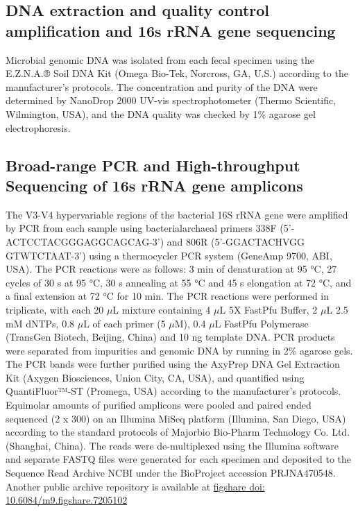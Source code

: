 \documentclass[fleqn,10pt]{wlpeerj} %
\begin{document}
  \subsection*{DNA extraction and quality control amplification and 16s rRNA gene sequencing}
  Microbial genomic DNA was isolated from each fecal specimen using the E.Z.N.A.® Soil DNA Kit (Omega Bio-Tek, Norcross, GA, U.S.) according to the manufacturer’s protocols. The concentration and purity of the DNA were determined by NanoDrop 2000 UV-vis spectrophotometer (Thermo Scientific, Wilmington, USA), and the DNA quality was checked by 1\% agarose gel electrophoresis.

  \subsection*{Broad-range PCR and High-throughput Sequencing of 16s rRNA gene amplicons}
  The V3-V4 hypervariable regions of the bacterial 16S rRNA gene were amplified by PCR from each sample using bacterial\/archaeal primers 338F (5’-ACTCCTACGGGAGGCAGCAG-3’) and 806R (5’-GGACTACHVGG GTWTCTAAT-3’) using a thermocycler PCR system (GeneAmp 9700, ABI, USA). The PCR reactions were as follows: 3 min of denaturation at 95 °C, 27 cycles of 30 s at 95 °C, 30 s annealing at 55 °C and 45 s elongation at 72 °C, and a final extension at 72 °C for 10 min. The PCR reactions were performed in triplicate, with each 20 $\mu$L mixture containing 4 $\mu$L 5X FastPfu Buffer, 2 $\mu$L 2.5 mM dNTPs, 0.8 $\mu$L of each primer (5 $\mu$M), 0.4 $\mu$L FastPfu Polymerase (TransGen Biotech, Beijing, China) and 10 ng template DNA.  PCR products were separated from impurities and genomic DNA by running in 2\% agarose gels.  The PCR bands were further purified using the AxyPrep DNA Gel Extraction Kit (Axygen Biosciences, Union City, CA, USA), and quantified using QuantiFluor™-ST (Promega, USA) according to the manufacturer’s protocols.
  Equimolar amounts of purified amplicons were pooled and paired ended sequenced (2 x 300) on an Illumina MiSeq platform (Illumina, San Diego, USA) according to the standard protocols of Majorbio Bio-Pharm Technology Co. Ltd. (Shanghai, China). The reads were de-multiplexed using the Illumina software and separate FASTQ files were generated for each specimen and deposited to the Sequence Read Archive NCBI under the BioProject accession PRJNA470548. Another public archive repository is available at \href{https://figshare.com/articles/Untitled_Item192_samples_for_publishing_Longitudinal_gut_microbiota_patterns_in_preterm_infants_with_necrotizing_enterocolitis_or_late-onset_sepsis_an_observational_prospective_study_/7205102}{figshare doi: 10.6084/m9.figshare.7205102}
\end{document}
